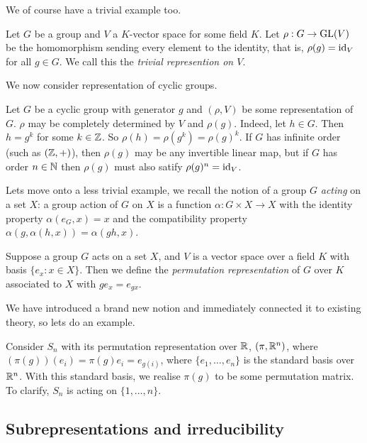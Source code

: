 We of course have a trivial example too.

\begin{example}
  Let $G$ be a group and $V$ a $K$-vector space for some field $K$. Let $\rho: G \to \operatorname{GL}(V)$ be the homomorphism sending every element to the identity, that is, $\rho(g) = \operatorname{id}_V$ for all $g \in G$. We call this the \emph{trivial represention on $V$}.
\end{example}

We now consider representation of cyclic groups.

\begin{example}
  Let $G$ be a cyclic group with generator $g$ and $(\rho, V)$ be some representation of $G$. $\rho$ may be completely determined by $V$ and $\rho(g)$. Indeed, let $h \in G$. Then $h = g^k$ for some $k \in \mathbb{Z}$. So $\rho(h) = \rho(g^k) = \rho(g)^k$. If $G$ has infinite order (such as $(\mathbb{Z}, +)$), then $\rho(g)$ may be any invertible linear map, but if $G$ has order $n \in \mathbb{N}$ then $\rho(g)$ must also satify $\rho(g)^n = \operatorname{id}_V$.
\end{example}

Lets move onto a less trivial example, we recall the notion of a group $G$ \emph{acting} on a set $X$: a group action of $G$ on $X$ is a function $\alpha: G \times X \to X$ with the identity property $\alpha(e_G, x) = x$ and the compatibility property $\alpha(g, \alpha(h,x)) = \alpha(gh, x)$.

\begin{definition}
  Suppose a group $G$ acts on a set $X$, and $V$ is a vector space over a field $K$ with basis $\{e_x: x \in X\}$. Then we define the \emph{permutation representation} of $G$ over $K$ associated to $X$ with $ge_x = e_{gx}$.
\end{definition}

We have introduced a brand new notion and immediately connected it to existing theory, so lets do an example.

\begin{example}
  Consider $S_n$ with its permutation representation over $\mathbb{R}$, $(\pi, \mathbb{R}^n)$, where $(\pi(g))(e_i) = \pi(g)e_i = e_{g(i)}$, where $\{e_1, \ldots, e_n\}$ is the standard basis over $\mathbb{R}^n$. With this standard basis, we realise $\pi(g)$ to be some permutation matrix. To clarify, $S_n$ is acting on $\{1, \ldots, n\}$.
\end{example}

\subsection{Subrepresentations and irreducibility}

